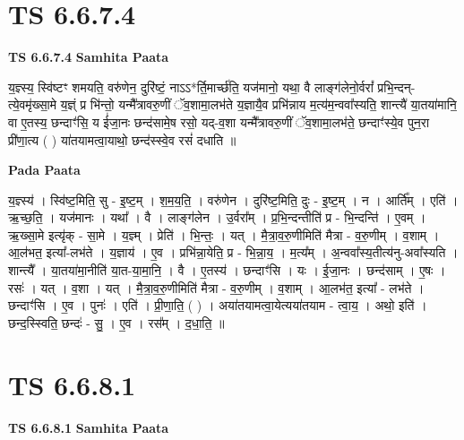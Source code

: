 \documentclass[17pt]{extarticle}
\begin{document}
\section*{ TS 6.6.7.4 }

\textbf{TS 6.6.7.4 } \newline
\textbf{Samhita Paata} \newline

य॒ज्ञ्स्य॒ स्वि॑ष्टꣳ शमयति॒ वरु॑णेन॒ दुरि॑ष्टं॒ नाऽऽ*र्ति॒मार्च्छ॑ति॒ यज॑मानो॒ यथा॒ वै लाङ्ग॑लेनो॒र्वरां᳚ प्रभि॒न्दन्-त्ये॒वमृ॑ख्सा॒मे य॒ज्ञ्ं प्र भि॑न्तो॒ यन्मै᳚त्रावरु॒णीं ॅव॒शामा॒लभ॑ते य॒ज्ञायै॒व प्रभि॑न्नाय म॒त्य॑म॒न्ववा᳚स्यति॒ शान्त्यै॑ या॒तया॑मानि॒ वा ए॒तस्य॒ छन्दाꣳ॑सि॒ य ई॑जा॒नः छन्द॑सामे॒ष रसो॒ यद्-व॒शा यन्मै᳚त्रावरु॒णीं ॅव॒शामा॒लभ॑ते॒ छन्दाꣳ॑स्ये॒व पुन॒रा प्री॑णा॒त्य ( ) या॑तयामत्वा॒याथो॒ छन्द॑स्स्वे॒व रसं॑ दधाति ॥ \newline

\textbf{Pada Paata} \newline

य॒ज्ञ्स्य॑ । स्वि॑ष्ट॒मिति॒ सु - इ॒ष्ट॒म् । श॒म॒य॒ति॒ । वरु॑णेन । दुरि॑ष्ट॒मिति॒ दुः - इ॒ष्ट॒म् । न । आर्ति᳚म् । एति॑ । ऋ॒च्छ॒ति॒ । यज॑मानः । यथा᳚ । वै । लाङ्ग॑लेन । उ॒र्वरा᳚म् । प्र॒भि॒न्दन्तीति॑ प्र - भि॒न्दन्ति॑ । ए॒वम् । ऋ॒ख्सा॒मे इत्यृ॑क् - सा॒मे । य॒ज्ञ्म् । प्रेति॑ । भि॒न्तः॒ । यत् । मै॒त्रा॒व॒रु॒णीमिति॑ मैत्रा - व॒रु॒णीम् । व॒शाम् । आ॒ल॑भत॒ इत्या᳚-लभ॑ते । य॒ज्ञाय॑ । ए॒व । प्रभि॑न्ना॒येति॒ प्र - भि॒न्ना॒य॒ । म॒त्य᳚म् । अ॒न्ववा᳚स्य॒तीत्य॑नु-अवा᳚स्यति । शान्त्यै᳚ । या॒तया॑मा॒नीति॑ या॒त-या॒मा॒नि॒ । वै । ए॒तस्य॑ । छन्दाꣳ॑सि । यः । ई॒जा॒नः । छन्द॑साम् । ए॒षः । रसः॑ । यत् । व॒शा । यत् । मै॒त्रा॒व॒रु॒णीमिति॑ मैत्रा - व॒रु॒णीम् । व॒शाम् । आ॒लभ॑त॒ इत्या᳚ - लभ॑ते । छन्दाꣳ॑सि । ए॒व । पुनः॑ । एति॑ । प्री॒णा॒ति॒ ( ) । अया॑तयामत्वा॒येत्यया॑तयाम - त्वा॒य॒ । अथो॒ इति॑ । छन्द॒स्स्विति॒ छन्दः॑ - सु॒ । ए॒व । रस᳚म् । द॒धा॒ति॒ ॥  \newline




\section*{ TS 6.6.8.1 }

\textbf{TS 6.6.8.1 } \newline
\textbf{Samhita Paata} \newline
\end{document}
